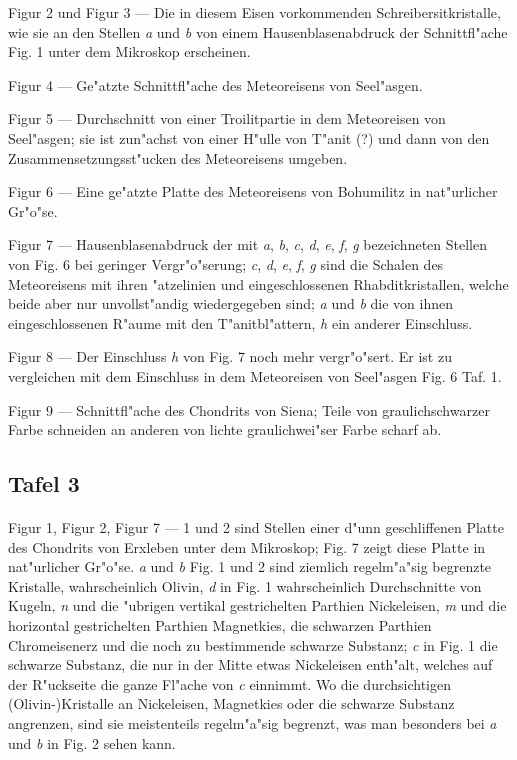 \documentclass[a4paper, 11pt, oneside, german]{article}
\begin{document}
Figur 2 und Figur 3 --- Die in diesem Eisen vorkommenden Schreibersitkristalle, wie sie an den Stellen \emph{a} und \emph{b} von einem Hausenblasenabdruck der Schnittfl"ache Fig. 1 unter dem Mikroskop erscheinen.

Figur 4 --- Ge"atzte Schnittfl"ache des Meteoreisens von Seel"asgen.

Figur 5 --- Durchschnitt von einer Troilitpartie in dem Meteoreisen von Seel"asgen; sie ist zun"achst von einer H"ulle von T"anit (?) und dann von den Zusammensetzungsst"ucken des Meteoreisens umgeben.

Figur 6 --- Eine ge"atzte Platte des Meteoreisens von Bohumilitz in nat"urlicher Gr"o"se.

Figur 7 --- Hausenblasenabdruck der mit \emph{a}, \emph{b}, \emph{c}, \emph{d}, \emph{e}, \emph{f}, \emph{g} bezeichneten Stellen von Fig. 6 bei geringer Vergr"o"serung; \emph{c}, \emph{d}, \emph{e}, \emph{f}, \emph{g} sind die Schalen des Meteoreisens mit ihren "atzelinien und eingeschlossenen Rhabditkristallen, welche beide aber nur unvollst"andig wiedergegeben sind; \emph{a} und \emph{b} die von ihnen eingeschlossenen R"aume mit den T"anitbl"attern, \emph{h} ein anderer Einschluss.

Figur 8 --- Der Einschluss \emph{h} von Fig. 7 noch mehr vergr"o"sert. Er ist zu vergleichen mit dem Einschluss in dem Meteoreisen von Seel"asgen Fig. 6 Taf. 1.

Figur 9 --- Schnittfl"ache des Chondrits von Siena; Teile von graulichschwarzer Farbe schneiden an anderen von lichte graulichwei"ser Farbe scharf ab.

\subsection{Tafel 3}
\paragraph{}
Figur 1, Figur 2, Figur 7 --- 1 und 2 sind Stellen einer d"unn geschliffenen Platte des Chondrits von Erxleben unter dem Mikroskop; Fig. 7 zeigt diese Platte in nat"urlicher Gr"o"se. \emph{a} und \emph{b} Fig. 1 und 2 sind ziemlich regelm"a"sig begrenzte Kristalle, wahrscheinlich Olivin, \emph{d} in Fig. 1 wahrscheinlich Durchschnitte von Kugeln, \emph{n} und die "ubrigen vertikal gestrichelten Parthien Nickeleisen, \emph{m} und die horizontal gestrichelten Parthien Magnetkies, die schwarzen Parthien Chromeisenerz und die noch zu bestimmende schwarze Substanz; \emph{c} in Fig. 1 die schwarze Substanz, die nur in der Mitte etwas Nickeleisen enth"alt, welches auf der R"uckseite die ganze Fl"ache von \emph{c} einnimmt. Wo die durchsichtigen (Olivin-)Kristalle an Nickeleisen, Magnetkies oder die schwarze Substanz angrenzen, sind sie meistenteils regelm"a"sig begrenzt, was man besonders bei \emph{a} und \emph{b} in Fig. 2 sehen kann.
\end{document}
